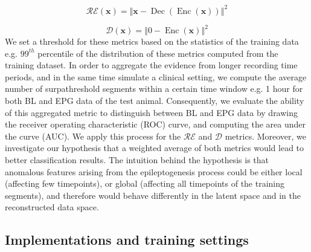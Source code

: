 \documentclass[pmlr]{jmlr}%
\begin{document}
\begin{equation}
\mathcal{RE(\mathbf{x})}= \left\Vert \mathbf{x} - \operatorname{Dec}(\operatorname{Enc}(\mathbf{x})) \right\Vert^2 
\end{equation}

\begin{equation}
\mathcal{D}(\mathbf{x})= \left\Vert 0 - \operatorname{Enc}(\mathbf{x}) \right\Vert^2
\end{equation}
We set a threshold for these metrics based on the statistics of the training data e.g. $99^{th}$ percentile of the distribution of these metrics computed from the training dataset. In order to aggregate the evidence from longer recording time periods, and in the same time simulate a clinical setting, we compute the average number of surpathreshold segments within a certain time window e.g. 1 hour for both BL and EPG data of the test animal. Consequently, we evaluate the ability of this aggregated metric to distinguish between BL and EPG data by drawing the receiver operating characteristic (ROC) curve, and computing the area under the curve (AUC). We apply this process for the $\mathcal{RE}$ and $\mathcal{D}$ metrics. Moreover, we investigate our hypothesis that a weighted average of both metrics would lead to better classification results. The intuition behind the hypothesis is that anomalous features arising from the epileptogenesis process could be either local (affecting few timepoints), or global (affecting all timepoints of the training segments), and therefore would behave differently in the latent space and in the reconstructed data space.



\subsection{Implementations and training settings}









\end{document}
